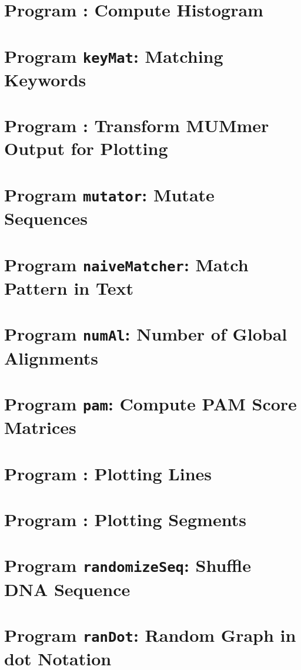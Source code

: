 \documentclass[a4paper]{report}
\begin{document}
\chapter{Program : Compute Histogram}\label{ch:his}

\chapter{Program \texttt{keyMat}: Matching Keywords}\label{ch:km}

\chapter{Program : Transform MUMmer Output for
  Plotting}\label{ch:m2p}

\chapter{Program \texttt{mutator}: Mutate Sequences}\label{ch:mut}

\chapter{Program \texttt{naiveMatcher}: Match Pattern in
  Text}\label{ch:nm}

\chapter{Program \texttt{numAl}: Number of Global Alignments}\label{ch:num}

\chapter{Program \texttt{pam}: Compute PAM Score
  Matrices}\label{ch:pam}

\chapter{Program : Plotting Lines}\label{ch:pl}

\chapter{Program : Plotting Segments}\label{ch:ps}

\chapter{Program \texttt{randomizeSeq}: Shuffle DNA
  Sequence}\label{ch:rs}

\chapter{Program \texttt{ranDot}: Random Graph in dot Notation}\label{ch:rd}

\end{document}
